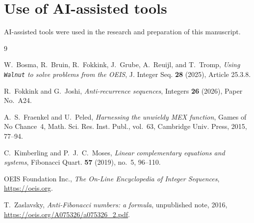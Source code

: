 \documentclass{amsart}
\theoremstyle{definition}
\theoremstyle{remark}
\numberwithin{equation}{section}
\numberwithin{table}{section}
\begin{document}
\section*{Use of AI-assisted tools}

AI-assisted tools were used in the research and preparation of this manuscript.

\begin{thebibliography}{9}

W.~Bosma, R.~Bruin, R.~Fokkink, J.~Grube, A.~Reuijl, and T.~Tromp, \emph{Using \texttt{Walnut} to solve problems from the OEIS}, J. Integer Seq. \textbf{28} (2025), Article 25.3.8.

R.~Fokkink and G.~Joshi, \emph{Anti-recurrence sequences}, Integers \textbf{26} (2026), Paper No.~A24.

A.~S.~Fraenkel and U.~Peled, \emph{Harnessing the unwieldy MEX function}, Games of No Chance~4, Math. Sci. Res. Inst. Publ., vol.~63, Cambridge Univ. Press, 2015, 77--94.

C.~Kimberling and P.~J.~C.~Moses, \emph{Linear complementary equations and systems}, Fibonacci Quart. \textbf{57} (2019), no.~5, 96--110.

OEIS Foundation Inc., \emph{The On-Line Encyclopedia of Integer Sequences}, \url{https://oeis.org}.

T.~Zaslavsky, \emph{Anti-Fibonacci numbers: a formula}, unpublished note, 2016, \url{https://oeis.org/A075326/a075326_2.pdf}.

\end{thebibliography}
\end{document}

